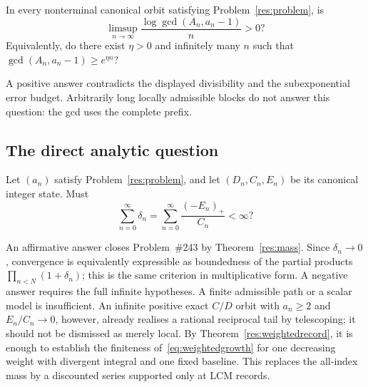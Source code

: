 \documentclass[11pt]{article}
\begin{document}
\begin{problem}\label{res:prefixgcd}
In every nonterminal canonical orbit satisfying Problem~\ref{res:problem}, is
\[
 \limsup_{n\to\infty}
 \frac{\log\gcd(A_n,a_n-1)}{n}>0?
\]
Equivalently, do there exist $\eta>0$ and infinitely many $n$ such that
$\gcd(A_n,a_n-1)\ge e^{\eta n}$?
\end{problem}

\noindent A positive answer contradicts the displayed divisibility and the
subexponential error budget.  Arbitrarily long locally admissible blocks do
not answer this question: the gcd uses the complete prefix.

\subsection{The direct analytic question}

\begin{problem}\label{res:masshyp}
Let $(a_n)$ satisfy Problem~\ref{res:problem}, and let $(D_n,C_n,E_n)$ be its
canonical integer state.  Must
\[
 \sum_{n=0}^{\infty}\delta_n
 =\sum_{n=0}^{\infty}\frac{(-E_n)_+}{C_n}<\infty ?
\]
\end{problem}

\noindent An affirmative answer closes Problem~\#243 by
Theorem~\ref{res:mass}.  Since $\delta_n\to0$, convergence is equivalently
expressible as boundedness of the partial products
$\prod_{n<N}(1+\delta_n)$; this is the same criterion in multiplicative form.
A negative answer requires the full infinite hypotheses.  A finite admissible
path or a scalar model is insufficient.  An infinite positive exact $C/D$
orbit with $a_n\ge2$ and $E_n/C_n\to0$, however, already realises a rational
reciprocal tail by telescoping; it should not be dismissed as merely local.
By Theorem~\ref{res:weightedrecord}, it is enough to establish the finiteness
of~\eqref{eq:weightedgrowth} for one decreasing weight with divergent
integral and one fixed baseline. This replaces the all-index mass by a
discounted series supported only at LCM records.
\end{document}
